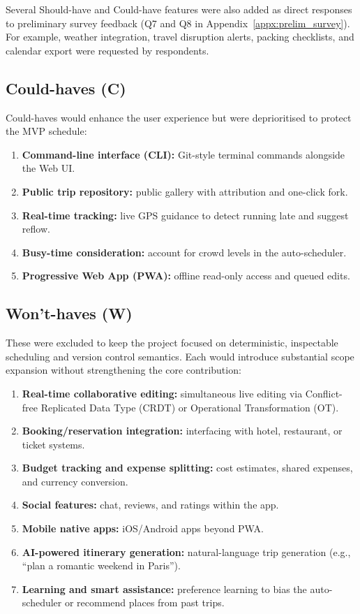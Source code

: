 Several Should-have and Could-have features were also added as direct responses to preliminary survey feedback (Q7 and Q8 in Appendix~\ref{appx:prelim_survey}). For example, weather integration, travel disruption alerts, packing checklists, and calendar export were requested by respondents.

\subsection*{Could-haves (C)}
Could-haves would enhance the user experience but were deprioritised to protect the MVP schedule:
\begin{enumerate}[label=\textbf{C\arabic*}]
  \item \textbf{Command-line interface (CLI):} Git-style terminal commands alongside the Web UI.
  \item \textbf{Public trip repository:} public gallery with attribution and one-click fork.
  \item \textbf{Real-time tracking:} live GPS guidance to detect running late and suggest reflow.
  \item \textbf{Busy-time consideration:} account for crowd levels in the auto-scheduler.
  \item \textbf{Progressive Web App (PWA):} offline read-only access and queued edits.
\end{enumerate}

\subsection*{Won't-haves (W)}
These were excluded to keep the project focused on deterministic, inspectable scheduling and version control semantics. Each would introduce substantial scope expansion without strengthening the core contribution:
\begin{enumerate}[label=\textbf{W\arabic*}]
  \item \textbf{Real-time collaborative editing:} simultaneous live editing via Conflict-free Replicated Data Type (CRDT) or Operational Transformation (OT).
  \item \textbf{Booking/reservation integration:} interfacing with hotel, restaurant, or ticket systems.
  \item \textbf{Budget tracking and expense splitting:} cost estimates, shared expenses, and currency conversion.
  \item \textbf{Social features:} chat, reviews, and ratings within the app.
  \item \textbf{Mobile native apps:} iOS/Android apps beyond PWA.
  \item \textbf{AI-powered itinerary generation:} natural-language trip generation (e.g., ``plan a romantic weekend in Paris'').
  \item \textbf{Learning and smart assistance:} preference learning to bias the auto-scheduler or recommend places from past trips.
\end{enumerate}

